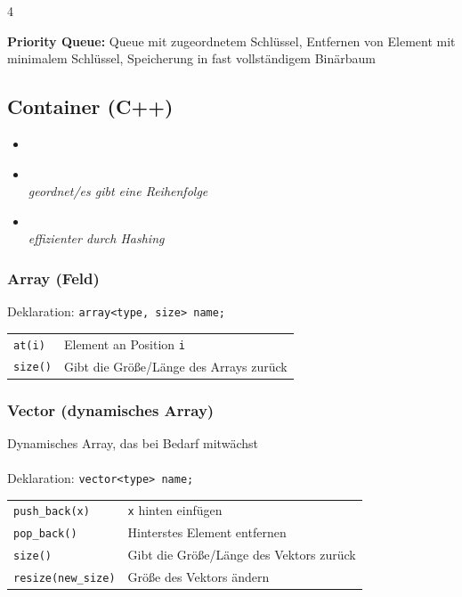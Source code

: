 \documentclass[fs, footer]{latex4ei}
\begin{document}
\begin{multicols*}{4}
{{\textbf{Priority Queue:} Queue mit zugeordnetem Schlüssel, Entfernen von Element mit minimalem Schlüssel, Speicherung in fast vollständigem Binärbaum\\

\subsection{Container (C++)}
\begin{itemize}
	\item {}
	\item {} \\ \textit{geordnet/es gibt eine Reihenfolge}
	\item {} \\ \textit{effizienter durch Hashing}
\end{itemize}

\subsubsection{Array (Feld)}
Deklaration: \texttt{array<type, size> name;}\\
\begin{tabular}{ll}
\texttt{at(i)}& Element an Position \texttt{i}\\
\texttt{size()}& Gibt die Größe/Länge des Arrays zurück\\
\end{tabular}

\subsubsection{Vector (dynamisches Array)}
Dynamisches Array, das bei Bedarf mitwächst\\ \\
Deklaration: \texttt{vector<type> name;}\\
\begin{tabular}{ll}
\texttt{push\_back(x)}& \texttt{x} hinten einfügen\\
\texttt{pop\_back()}& Hinterstes Element entfernen\\
\texttt{size()}& Gibt die Größe/Länge des Vektors zurück\\
\texttt{resize(new\_size)}& Größe des Vektors ändern\\
\end{tabular}

}}
\end{multicols*}
\end{document}

